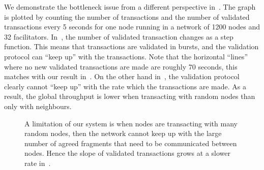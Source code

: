 We demonstrate the bottleneck issue from a different perspective in~.
The graph is plotted by counting the number of transactions and the number of validated transactions every 5 seconds for one node running in a network of 1200 nodes and 32 facilitators.
In~, the number of validated transaction changes as a step function.
This means that transactions are validated in bursts, and the validation protocol can ``keep up'' with the transactions.
Note that the horizontal ``lines'' where no new validated transactions are made are roughly 70 seconds, this matches with our result in~.
On the other hand in~, the validation protocol clearly cannot ``keep up'' with the rate which the transactions are made.
As a result, the global throughput is lower when transacting with random nodes than only with neighbours.

\begin{figure}[tb]
  \centering
  \caption{A limitation of our system is when nodes are transacting with many random nodes,
  then the network cannot keep up with the large number of agreed fragments that need to be communicated between nodes.
  Hence the slope of validated transactions grows at a slower rate in~.}
  \label{fig:backlog}
\end{figure}
